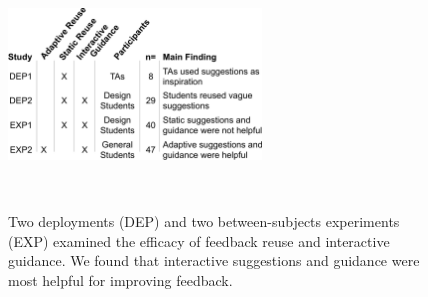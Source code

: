 \begin{figure}
\centering
  \includegraphics[width=0.6\textwidth]{critiquekit/figures/table1.png}
  \caption{Two deployments (DEP) and two between-subjects experiments (EXP) examined the efficacy of feedback reuse and interactive guidance. We found that interactive suggestions and guidance were most helpful for improving feedback.}~\label{table:critiquekit_all_results}
\end{figure}
